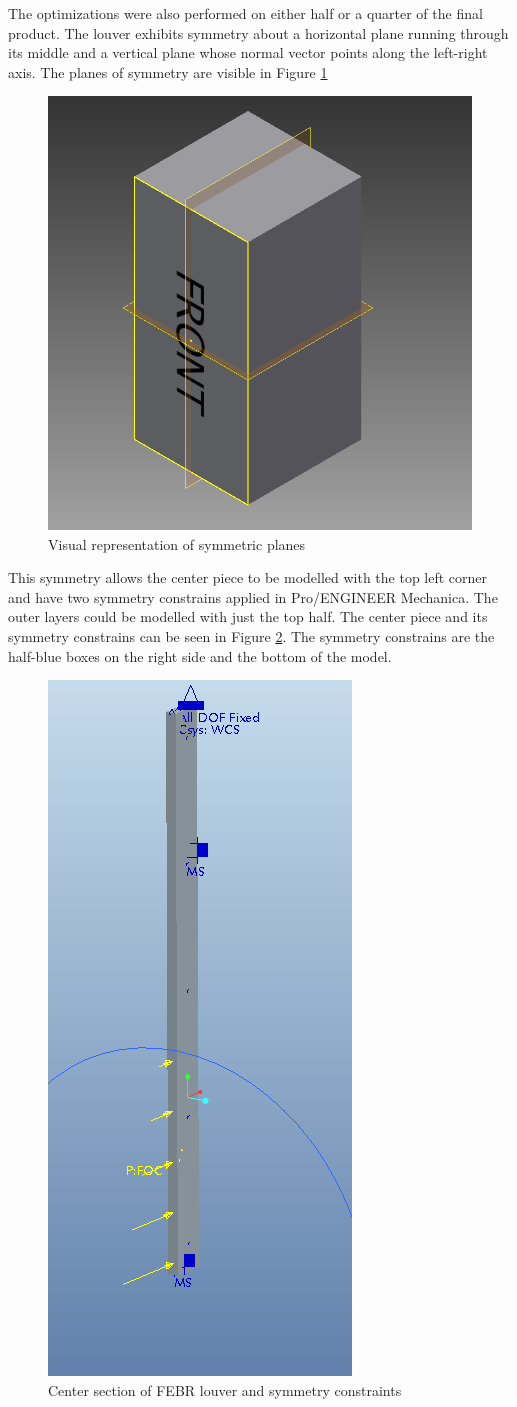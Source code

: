 \documentclass[12pt,letterpaper]{report}
\begin{document}
		The optimizations were also performed on either half or a quarter of the final product.  The louver exhibits symmetry about a horizontal plane running through its middle and a vertical plane whose normal vector points along the left-right axis.  The planes of symmetry are visible in Figure \ref{fig:Symmetry}
		
		\begin{figure}[H]
			\centering
			\includegraphics[width=.45\textwidth]{Symmetry}
			\caption{Visual representation of symmetric planes}
			\label{fig:Symmetry}
		\end{figure}
		
		This symmetry allows the center piece to be modelled with the top left corner and have two symmetry constrains applied in Pro/ENGINEER Mechanica.  The outer layers could be modelled with just the top half.  The center piece and its symmetry constrains can be seen in Figure \ref{fig:SymmetryConstrains}.  The symmetry constrains are the half-blue boxes on the right side and the bottom of the model.

		\graphicspath{ {./ScreenShots/Sinusoidal/} }
		\begin{figure}[h!]
			\centering
			\includegraphics[width=.25\textwidth]{WaveForceCenterSetUp}
			\caption{Center section of FEBR louver and symmetry constraints}
			\label{fig:SymmetryConstrains}
		\end{figure}
		\graphicspath{ {..} }
		
\end{document}
